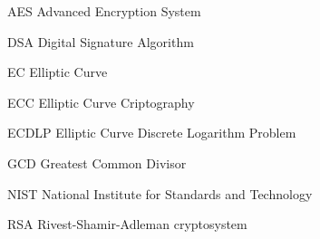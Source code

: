 \begin{siglas}
  \item[AES] Advanced Encryption System
  \item[DSA] Digital Signature Algorithm
  \item[EC] Elliptic Curve
  \item[ECC] Elliptic Curve Criptography
  \item[ECDLP] Elliptic Curve Discrete Logarithm Problem
  \item[GCD] Greatest Common Divisor
  \item[NIST] National Institute for Standards and Technology
  \item[RSA] Rivest-Shamir-Adleman cryptosystem
\end{siglas}
